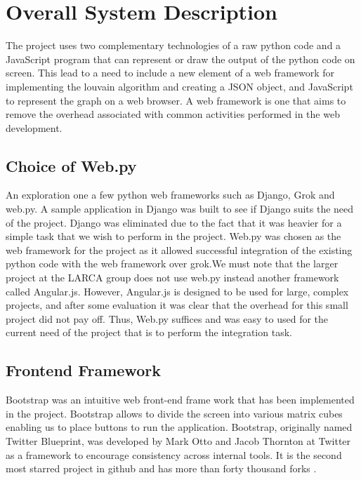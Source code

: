 \chapter{Overall System Description}
The project uses two complementary technologies of a raw python code and a JavaScript program that can represent or draw the output of the python code on screen. This lead to a need to include a new element of a web framework for implementing the louvain algorithm and creating a JSON object, and JavaScript to represent the graph on a web browser.   A web framework is one that aims to remove the overhead associated with common activities performed in the web development. 
\section{Choice of Web.py}
An exploration one a few python web frameworks such as Django, Grok and web.py. A sample application in Django was built to see if Django suits the need of the project. Django was eliminated due to the fact that it was heavier for a simple task that we wish to perform in the project. Web.py was chosen as the web framework for the project as it allowed successful integration  of the existing python code with the web framework over grok.We must note that the larger project at the LARCA group does not use web.py instead another framework called Angular.js. However, Angular.js is designed to be used for large, complex projects, and after some evaluation it was clear that the overhead for this small project did not pay off. 
Thus, Web.py suffices and was easy to used for the current need of the project that is to perform the integration task.  

\section{Frontend Framework}
Bootstrap was an intuitive web front-end frame work that has been implemented in the project.  Bootstrap allows to divide the screen into various matrix cubes enabling us to place buttons to run the application. Bootstrap, originally named Twitter Blueprint, was developed by Mark Otto and Jacob Thornton at Twitter as a framework to encourage consistency across internal tools. It is the second most starred project in github and has more than forty thousand forks \cite{bootstrap}.


